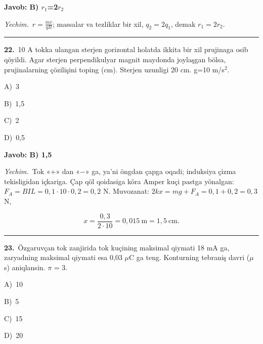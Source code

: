 \documentclass[11pt,a4paper]{article}
\newcommand{\opt}[2]{\hspace*{4mm}#1)\ #2\par}
\begin{document}
\noindent\colorbox{gray!12}{\parbox{\dimexpr\linewidth-2\fboxsep}{\textbf{Javob: B) $r_1$=2$r_2$}}}\par\smallskip
\noindent\textit{Yechim.}\ $r=\frac{mv}{qB}$; massalar va tezliklar bir xil, $q_2=2q_1$, demak $r_1=2r_2$.\par\par\medskip\hrule\medskip
{}\noindent\begin{minipage}{\linewidth}
\textbf{22.}\ 10 A tokka ulangan sterjen gorizontal holatda ikkita bir xil prujinaga osib qöyildi. Agar sterjen perpendikulyar magnit maydonda joylaşgan bölsa, prujinalarning çözilişini toping (cm). Sterjen uzunligi 20 cm. g=10 m/s$^{2}$.\par\smallskip
\noindent\hspace*{4mm}\par\smallskip
\opt{A}{3}
\opt{B}{1,5}
\opt{C}{2}
\opt{D}{0,5}
\end{minipage}\vspace{2pt}\par
\noindent\colorbox{gray!12}{\parbox{\dimexpr\linewidth-2\fboxsep}{\textbf{Javob: B) 1,5}}}\par\smallskip
\noindent\textit{Yechim.}\ Tok «+» dan «$-$» ga, ya’ni öngdan çapga oqadi; induksiya çizma tekisligidan içkariga. Çap qöl qoidasiga köra Amper kuçi pastga yönalgan: $F_A=BIL=0{,}1\cdot10\cdot0{,}2=0{,}2$ N. Muvozanat: $2kx=mg+F_A=0{,}1+0{,}2=0{,}3$ N,\par
\[x=\frac{0{,}3}{2\cdot10}=0{,}015\ \text{m}=1{,}5\ \text{cm}.\]\par\medskip\hrule\medskip
{}\noindent\begin{minipage}{\linewidth}
\textbf{23.}\ Özgaruvçan tok zanjirida tok kuçining maksimal qiymati 18 mA ga, zaryadning maksimal qiymati esa 0,03 $\mu$C ga teng. Konturning tebraniş davri ($\mu$s) aniqlansin. $\pi$ = 3.\par\smallskip
\opt{A}{10}
\opt{B}{5}
\opt{C}{15}
\opt{D}{20}
\end{minipage}\vspace{2pt}\par
\end{document}
